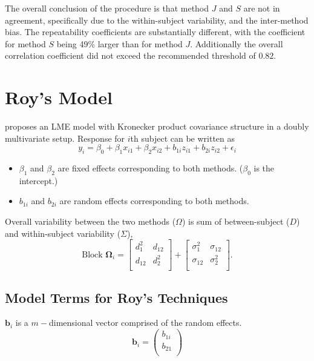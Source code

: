 \documentclass[12pt, a4paper]{report}
\theoremstyle{plain}
\theoremstyle{definition}
\theoremstyle{remark}
\begin{document}
The overall conclusion of the procedure is that method $J$ and $S$ are not in agreement, specifically due to the within-subject variability, and the inter-method bias. The repeatability coefficients are substantially different, with the coefficient for method $S$ being 49\% larger than for method $J$. Additionally the overall correlation coefficient did not exceed the recommended threshold of $0.82$.
	
\chapter{Roy's Model}
	\citet{ARoy2009} proposes an LME model with Kronecker product covariance structure in a doubly multivariate setup. Response for $i$th subject can be written as
	\[ y_i = \beta_0 + \beta_1x_{i1} + \beta_2x_{i2} + b_{1i}z_{i1}  + b_{2i}z_{i2} + \epsilon_i \]
	\begin{itemize}
		\item $\beta_1$ and $\beta_2$ are fixed effects corresponding to both methods. ($\beta_0$ is the intercept.)
		\item $b_{1i}$ and $b_{2i}$ are random effects corresponding to both methods.
	\end{itemize}
	
	Overall variability between the two methods ($\Omega$) is sum of between-subject ($D$) and within-subject variability ($\Sigma$),
	\[
	\mbox{Block } \boldsymbol{\Omega}_i = \left[ \begin{array}{cc} d^2_1 & d_{12}\\ d_{12} & d^2_2\\ \end{array} \right]
	+ \left[\begin{array}{cc} \sigma^2_1 & \sigma_{12}\\ \sigma_{12} & \sigma^2_2\\ \end{array}\right].
	\]
	
	

	\section{Model Terms for Roy's Techniques}
$\boldsymbol{b}_{i}$ is a $m-$dimensional vector comprised of
		the random effects.
		\begin{equation}
		\boldsymbol{b}_{i} = \left( \begin{array}{c}
		b_{1i} \\
		b_{21}  \\
		\end{array}\right)
		\end{equation}
		
\end{document}
